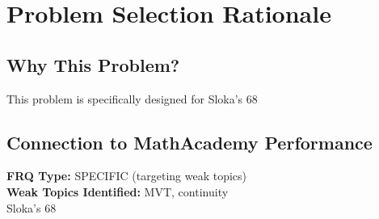 \documentclass[11pt,letterpaper]{article}
\begin{document}
\vspace{0.5cm}


\newpage

\section*{\textcolor{alphablue}{Problem Selection Rationale}}

\subsection*{Why This Problem?}
This problem is specifically designed for Sloka's 68%

\subsection*{Connection to MathAcademy Performance}
\begin{tcolorbox}[colback=yellow!5!white, colframe=orange!70, title=\textbf{Quiz Performance: 68\%}, arc=2mm]
  \textbf{FRQ Type:} SPECIFIC (targeting weak topics) \\
  \textbf{Weak Topics Identified:} MVT, continuity \\[0.3cm]

  Sloka's 68%
\end{tcolorbox}
\end{document}
